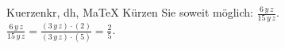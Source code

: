 \begin{MAufgabe}{Kuerzen}{kr, dh, MaTeX}
K\"urzen Sie soweit m\"oglich: $\frac{6\, y\, z}{15\, y\, z}$.\\ 
\ifLsg\MLoesung
\quad $\frac{6\, y\, z}{15\, y\, z}=\frac{(3\, y\, z)\cdot(2)}{(3\, y\, z)\cdot(5)}=\frac{2}{5}$.\else\relax\fi
 \end{MAufgabe}